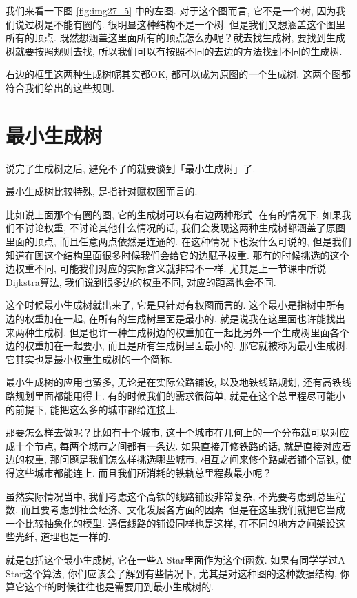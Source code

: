 我们来看一下图 \ref{fig:img27_5} 中的左图. 对于这个图而言, 它不是一个树, 因为我们说过树是不能有圈的. 很明显这种结构不是一个树. 但是我们又想涵盖这个图里所有的顶点. 既然想涵盖这里面所有的顶点怎么办呢？就去找生成树, 要找到生成树就要按照规则去找, 所以我们可以有按照不同的去边的方法找到不同的生成树. 

右边的框里这两种生成树呢其实都OK, 都可以成为原图的一个生成树. 这两个图都符合我们给出的这些规则. 

\section{最小生成树}

说完了生成树之后, 避免不了的就要谈到「最小生成树」了. 

最小生成树比较特殊, 是指针对赋权图而言的. 

比如说上面那个有圈的图, 它的生成树可以有右边两种形式. 在有的情况下, 如果我们不讨论权重, 不讨论其他什么情况的话, 我们会发现这两种生成树都涵盖了原图里面的顶点, 而且任意两点依然是连通的. 在这种情况下也没什么可说的, 但是我们知道在图这个结构里面很多时候我们会给它的边赋予权重. 那有的时候挑选的这个边权重不同, 可能我们对应的实际含义就非常不一样. 尤其是上一节课中所说Dijkstra算法, 我们说到很多边的权重不同, 对应的距离也会不同. 

这个时候最小生成树就出来了, 它是只针对有权图而言的. 这个最小是指树中所有边的权重加在一起, 在所有的生成树里面是最小的. 就是说我在这里面也许能找出来两种生成树, 但是也许一种生成树边的权重加在一起比另外一个生成树里面各个边的权重加在一起要小, 而且是所有生成树里面最小的. 那它就被称为最小生成树. 它其实也是最小权重生成树的一个简称. 

最小生成树的应用也蛮多, 无论是在实际公路铺设, 以及地铁线路规划, 还有高铁线路规划里面都能用得上. 有的时候我们的需求很简单, 就是在这个总里程尽可能小的前提下, 能把这么多的城市都给连接上. 

那要怎么样去做呢？比如有十个城市, 这十个城市在几何上的一个分布就可以对应成十个节点, 每两个城市之间都有一条边. 如果直接开修铁路的话, 就是直接对应着边的权重, 那问题是我们怎么样挑选哪些城市, 相互之间来修个路或者铺个高铁, 使得这些城市都能连上. 而且我们所消耗的铁轨总里程数最小呢？

虽然实际情况当中, 我们考虑这个高铁的线路铺设非常复杂, 不光要考虑到总里程数, 而且要考虑到社会经济、文化发展各方面的因素. 但是在这里我们就把它当成一个比较抽象化的模型. 通信线路的铺设同样也是这样, 在不同的地方之间架设这些光纤, 道理也是一样的. 


就是包括这个最小生成树, 它在一些A-Star里面作为这个f函数. 如果有同学学过A-Star这个算法, 你们应该会了解到有些情况下, 尤其是对这种图的这种数据结构, 你算它这个f的时候往往也是需要用到最小生成树的. 

